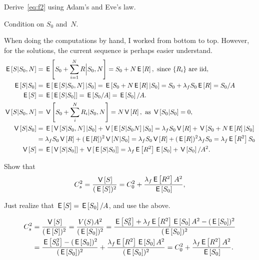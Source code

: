 \documentclass[stochastic-or.tex]{subfiles}
\begin{document}
\begin{exercise}\label{ex:f-4}
Derive~\cref{eq:f2} using  Adam's and Eve's law.
\begin{hint}
Condition on $S_0$ and~$N$.
\end{hint}
\begin{solution}
When doing the computations by hand, I worked from bottom to top. However, for the solutions, the current sequence is perhaps easier understand.
\begin{align*}
  \E{S|S_0, N} &=\E{S_0 + \sum_{i=1}^N R \Big|S_0, N} = S_0 + N \E R, \text{ since $\{R_i\}$ are iid},\\
  \E{S|S_0} &= \E{\E{S|S_{0}, N}|S_0} = \E{S_0 + N \E R |S_{0}} = S_0 + \lambda_f S_0 \E R = S_{0}/A\\
  \E{S} &= \E{\E{S|S_{0}}} = \E{S_0/A} = \E{S_0}/A.\\
  \V{S|S_0, N} &=  \V{S_0 + \sum_i^N R_i| S_{0}, N} = N \V R, \text{ as } \V{S_0|S_0} = 0,\\
\V{S|S_0} &= \E{\V{S|S_0, N} |S_0} + \V{\E{S|S_{0}N}|S_{0}} = \lambda_f S_0 \V R + \V{S_{0} + N \E R|S_0}\\
  &= \lambda_f S_0\V R + (\E R)^{2} \V{N|S_0} = \lambda_f S_0\V R + (\E R)^{2} \lambda_{f} S_{0} = \lambda_{f} \E{R^{2}} S_{0}\\
  \V S &= \E{\V{S|S_0}} + \V{\E{S|S_0}} =  \lambda_f \E{R^2} \E{S_0}  + \V{S_{0}}/A^{2}.
\end{align*}

\end{solution}
\end{exercise}


\begin{exercise}\label{ex:l-160}
Show that
 \begin{equation*}
 C_s^2 = \frac{\V{S}}{(\E S)^2} = C_0^2 + \frac{\lambda_f \E{R^2} A^2}{\E{S_0}},
 \end{equation*}
\begin{hint} Just realize that $\E{S} = \E{S_0}/A$, and use the above.
\end{hint}
\begin{solution}
 \begin{align*}
C_s^2 &= \frac{\V{S}}{(\E S)^2} =\frac{V(S) A^2}{(\E{S_0})^2}
=\frac{\E{S_0^2} + \lambda_f \E{R^2} \E{S_0}A^2 -(\E{S_0})^2}{(\E{S_0})^2} \\
&=\frac{\E{S_0^2} -(\E{S_0})^2}{(\E{S_0})^2} + \frac{\lambda_f \E{R^2} \E{S_0}A^2}{(\E{S_0})^2}
=C_0^2 + \frac{\lambda_f \E{R^2}A^2}{\E{S_0}}.
 \end{align*}
\end{solution}
\end{exercise}
\end{document}
